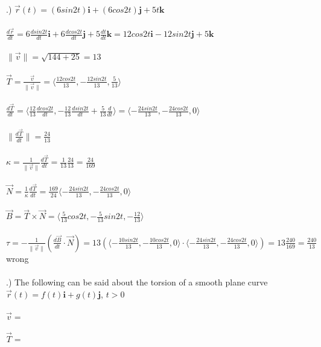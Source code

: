 \documentclass[12pt]{article}
\begin{document}
.) $\vec{r}(t) = (6sin{2t})\mathbf{i} + (6cos{2t})\mathbf{j} + 5t\mathbf{k}$\\\\
\noindent $\frac{d\vec{r}}{dt} = 6\frac{dsin{2t}}{dt}\mathbf{i} + 6\frac{dcos{2t}}{dt}\mathbf{j} + 5\frac{dt}{dt}\mathbf{k} =
12cos{2t}\mathbf{i} - 12sin{2t}\mathbf{j} + 5\mathbf{k}$\\\\
\noindent $\| \vec{v} \| = \sqrt{144 + 25} = 13 $\\\\
\noindent $\vec{T} = \frac{\vec{v}}{\| \vec{v} \|} = \langle \frac{12cos{2t}}{13}, -\frac{12sin{2t}}{13}, \frac{5}{13}\rangle$\\\\
\noindent $\frac{d\vec{T}}{dt} = \langle \frac{12}{13}\frac{dcos{2t}}{dt} , -\frac{12}{13}\frac{dsin{2t}}{dt} + \frac{5}{13}\frac{d}{dt}\rangle
= \langle -\frac{24sin{2t}}{13}, -\frac{24cos{2t}}{13}, 0 \rangle$\\\\
\noindent $\| \frac{d\vec{T}}{dt} \|  = \frac{24}{13}$\\\\
\noindent $\kappa = \frac{1}{\| \vec{v} \| }\frac{d\vec{T}}{dt} = \frac{1}{13}\frac{24}{13} =\frac{24}{169}$\\\\
\noindent $\vec{N} = \frac{1}{\kappa}\frac{d\vec{T}}{dt} = \frac{169}{24}\langle -\frac{24sin{2t}}{13}, -\frac{24cos{2t}}{13}, 0\rangle $\\\\
\noindent $\vec{B} = \vec{T} \times \vec{N} = \langle \frac{5}{13}cos{2t}, -\frac{5}{13}sin{2t}, -\frac{12}{13}\rangle$\\\\
\noindent $\tau = -\frac{1}{\| \vec{v} \| }(\frac{d\vec{B}}{dt}\cdot \vec{N}) = 13(\langle -\frac{10sin{2t}}{13}, -\frac{10cos{2t}}{13}, 0\rangle \cdot \langle -\frac{24sin{2t}}{13}, -\frac{24cos{2t}}{13}, 0\rangle) = 13\frac{240}{169} = \frac{240}{13}$ wrong\\\\
.) The following can be said about the torsion of a smooth plane curve $\vec{r}(t) = f(t)\mathbf{i} + g(t)\mathbf{j}$, \hspace{10pt} $t > 0$\\\\
\noindent $\vec{v} = $\\\\
\noindent $\vec{T} = $\\\\
\end{document}
